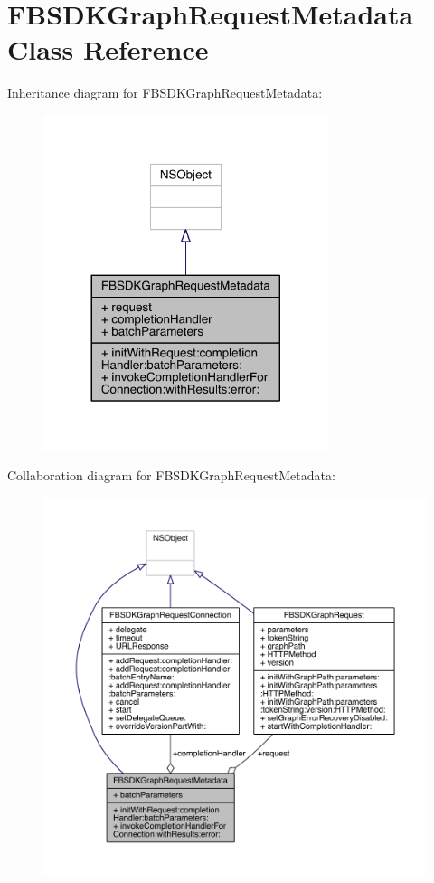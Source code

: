 \hypertarget{interface_f_b_s_d_k_graph_request_metadata}{\section{F\-B\-S\-D\-K\-Graph\-Request\-Metadata Class Reference}
\label{interface_f_b_s_d_k_graph_request_metadata}
}


Inheritance diagram for F\-B\-S\-D\-K\-Graph\-Request\-Metadata\-:
\nopagebreak
\begin{figure}[H]
\begin{center}
\leavevmode
\includegraphics[width=236pt]{interface_f_b_s_d_k_graph_request_metadata__inherit__graph}
\end{center}
\end{figure}


Collaboration diagram for F\-B\-S\-D\-K\-Graph\-Request\-Metadata\-:
\nopagebreak
\begin{figure}[H]
\begin{center}
\leavevmode
\includegraphics[width=350pt]{interface_f_b_s_d_k_graph_request_metadata__coll__graph}
\end{center}
\end{figure}
